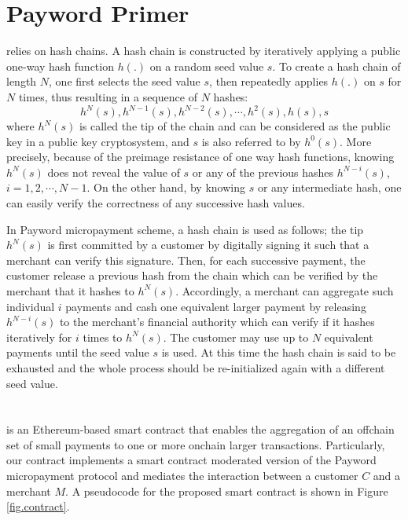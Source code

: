 
\section{Payword Primer}

\pw relies on hash chains. A hash chain is constructed by iteratively applying a public one-way hash function $h(.)$ on a random seed value $s$. To create a hash chain of length $N$, one first selects the seed value $s$, then repeatedly applies $h(.)$ on $s$ for $N$ times, thus resulting in a sequence of $N$ hashes:
\[h^N(s), h^{N-1}(s), h^{N-2}(s), \cdots, h^2(s), h(s),s \]
where $h^N(s)$ is called the tip of the chain and can be considered as the public key in a public key cryptosystem, and $s$ is also referred to by $h^0(s)$. More precisely, because of the preimage resistance of one way hash functions, knowing $h^N(s)$ does not reveal the value of $s$ or any of the previous hashes $h^{N-i}(s)$, $i=1,2,\cdots,N-1$. On the other hand, by knowing $s$ or any intermediate hash, one can easily verify the correctness of any successive hash values.

In Payword micropayment scheme, a hash chain is used as follows; the tip $h^N(s)$ is first committed by a customer by digitally signing it such that a merchant can verify this signature. Then, for each successive payment, the customer release a previous hash from the chain which can be verified by the merchant that it hashes to $h^N(s)$. Accordingly, a merchant can aggregate such individual $i$ payments and cash one equivalent larger payment by releasing $h^{N-i}(s)$ to the merchant's financial authority which can verify if it hashes iteratively for $i$ times to $h^N(s)$. The customer may use up to $N$ equivalent payments until the seed value $s$ is used. At this time the hash chain is said to be exhausted and the whole process should be re-initialized again with a different seed value. 


\section{\ew}

\ew is an Ethereum-based smart contract that enables the aggregation of an offchain set of small payments to one or more onchain larger transactions. Particularly, our contract implements a smart contract moderated version of the Payword micropayment protocol and mediates the interaction between a customer $C$ and a merchant $M$. A pseudocode for the proposed smart contract is shown in Figure \ref{fig.contract}. 

